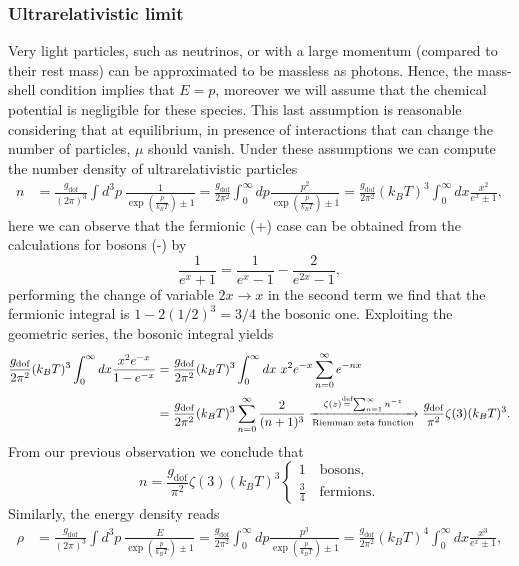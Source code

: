 \subsubsection{Ultrarelativistic limit}
Very light particles, such as neutrinos, or with a large momentum (compared to their rest mass) can be approximated to be massless as photons. Hence, the mass-shell condition implies that $E=p$, moreover we will assume that the chemical potential is negligible for these species. This last assumption is reasonable considering that at equilibrium, in presence of interactions that can change the number of particles, $\mu$ should vanish. Under these assumptions we can compute the number density of ultrarelativistic particles 
\begin{align*}
    n&=\frac{g_\text{dof}}{(2\pi)^3}\int d^3p\ \frac{1}{\exp(\frac{p}{k_BT})\pm1}=\frac{g_\text{dof}}{2\pi^2}\int_0^\infty dp \frac{p^2 }{\exp(\frac{p}{k_BT})\pm1}=\frac{g_\text{dof}}{2\pi^2}(k_BT)^3\int_0^\infty dx \frac{x^2}{e^x\pm1},
\end{align*}
    here we can observe that the fermionic (+) case can be obtained from the calculations for bosons (-) by
    $$
        \frac{1}{e^x+1}=\frac{1}{e^x-1}-\frac{2}{e^{2x}-1},
    $$
    performing the change of variable $2x\rightarrow x$ in the second term we find that the fermionic integral is $1-2(1/2)^3=3/4$ the bosonic one. Exploiting the geometric series, the bosonic integral yields
\begin{align*}
   \frac{g_\text{dof}}{2\pi^2}(k_BT)^3\int_{0}^{\infty}dx\frac{x^2e^{-x}}{1-e^{-x}}  &=\frac{g_\text{dof}}{2\pi^2}(k_BT)^3\int_0^\infty dx\ x^2e^{-x}\sum_{n=0}^{\infty} e^{-nx}\nonumber\\&=\frac{g_\text{dof}}{2\pi^2}(k_BT)^3\sum_{n=0}^{\infty}\frac{2}{(n+1)^3}\xrightarrow[\text{Riemman zeta function}]{\zeta(z)\stackrel{\text{def}}{=}\sum_{n=1}^\infty n^{-z}}\frac{g_\text{dof}}{\pi^2}\zeta(3)(k_BT)^3.
\end{align*}
From our previous observation we conclude that
\begin{equation}
    n=\frac{g_\text{dof}}{\pi^2}\zeta(3)(k_BT)^3\begin{cases}
        1\quad \text{bosons},\\
        \frac{3}{4}\quad \text{fermions.}
    \end{cases}
    \label{eq:relativistic_number_density}
\end{equation}
Similarly, the energy density reads
\begin{align*}
    \rho&=\frac{g_\text{dof}}{(2\pi)^3}\int d^3p\ \frac{E}{\exp(\frac{p}{k_BT})\pm1}=\frac{g_\text{dof}}{2\pi^2}\int_0^\infty dp \frac{p^3 }{\exp(\frac{p}{k_BT})\pm1}=\frac{g_\text{dof}}{2\pi^2}(k_BT)^4\int_0^\infty dx \frac{x^3}{e^x\pm1},
\end{align*}
